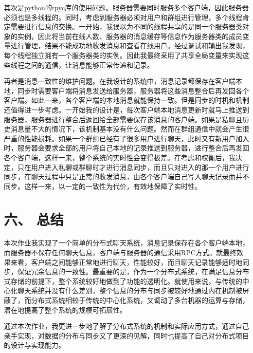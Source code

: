 \documentclass{report}
\begin{document}
其次是python的rpyc库的使用问题。服务器需要同时服务多个客户端，因此服务器必须也是多线程的。同时，考虑到服务器必须对用户和群组进行管理，多个线程肯定需要进行信息的交换。一开始，我误以为不同的线程共享的是同一个服务器类对象的实例，因此将当前在线人数、服务器的消息缓存等信息作为服务器类的成员变量进行管理，结果不能成功地收发消息和查看在线用户。经过调试和输出我发现，每个线程独立拥有一个服务器类的实例。因此我最终采用了共享全局变量来实现这些线程之间的通信，让消息能够正常传递和记录。

再者是消息一致性的维护问题。在我设计的系统中，消息记录都保存在客户端本地，同步时需要客户端将消息发送给服务器，服务器将这些消息整合后再发回各个客户端。如此一来，各个客户端的本地消息就能保持一致。但是同步的时机和机制还值得进一步考虑。一开始我的设计是，每次客户端本地消息更新时就马上推送到服务器，服务器进行整合后返回给全部需要保存该消息的客户端。如果是私聊且历史消息量不大的情况下，该机制基本没有什么问题。然而在群组通信中就会产生很严重的性能损耗。如果一个群组已经有了很多用户进行聊天，此时又有新用户加入时，服务器会要求全部的用户将自己本地的记录推送到服务器，进行整合后再发回各个客户端，这样一来，整个系统的实时性会变得极差。在考虑和权衡后，我决定，只在用户进入私聊或群聊时才进行消息同步，而且只对进入的那一个用户进行同步，在聊天过程中只是正常的收发消息，由各个客户端自己写入聊天记录而并不同步。这样一来，以一定的一致性为代价，有效地保障了实时性。

\section*{六、 总结}
 本次作业我实现了一个简单的分布式聊天系统，消息记录保存在各个客户端本地，而服务器不保存任何聊天信息，客户端与服务器的通信采用RPC方式。就最终效果来看，客户端之间能够正常地进行聊天，性能较好，而且聊天记录能够适时地同步，保证冗余信息的一致性。最重要的是，作为一个分布式系统，在满足信息分布式存储的前提下，整个系统较好地做到了功能的透明化。就使用来说，与传统的中心化聊天系统并没有什么差别，整个信息的分布与同步被较好地通过内在机制被屏蔽了，而分布式系统相较于传统的中心化系统，又调动了多台机器的运算与存储，潜在地提高了整个系统的规模可拓展性。
 
通过本次作业，我更进一步地了解了分布式系统的机制和实际应用方式，通过自己亲手实现，对数据的分布与同步又了更深的见解，同时也提高了自己对分布式项目的设计与实现能力。
\end{document}
